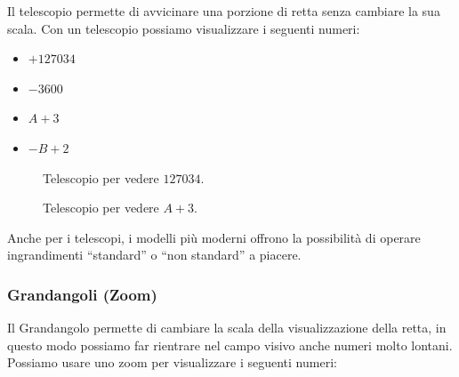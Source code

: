 Il telescopio permette di avvicinare una porzione di retta senza cambiare la 
sua scala. 
Con un telescopio possiamo visualizzare i seguenti numeri:

\begin{multicols}{4}
\begin{itemize}[nosep]
 \item $+127034$
 \item $-3600$
 \item $A+3$
 \item $-B+2$
\end{itemize}
\end{multicols}
\vspace{-5mm}
\begin{figure}[h]
\begin{inaccessibleblock}

\begin{minipage}{.48\linewidth}
 \begin{center}
\telescopioa
 \end{center}
\caption{Telescopio per vedere \(127034\).} \label{fig:telescopioa}
\end{minipage}
\hfill
\begin{minipage}{.48\linewidth}
 \begin{center}
\telescopiob
 \end{center}
\caption{Telescopio per vedere \(A+3\).} \label{fig:telescopiob}
\end{minipage}

\end{inaccessibleblock}
\end{figure}

Anche per i telescopi, i modelli più moderni offrono la possibilità di 
operare 
ingrandimenti ``standard'' o ``non standard'' a piacere.

\subsubsection{Grandangoli (Zoom)}
\label{subsec:insnum_zoom}

Il Grandangolo permette di cambiare la scala della visualizzazione della 
retta, 
in questo modo possiamo far rientrare nel campo visivo anche numeri molto 
lontani.
Possiamo usare uno zoom per visualizzare i seguenti numeri:

